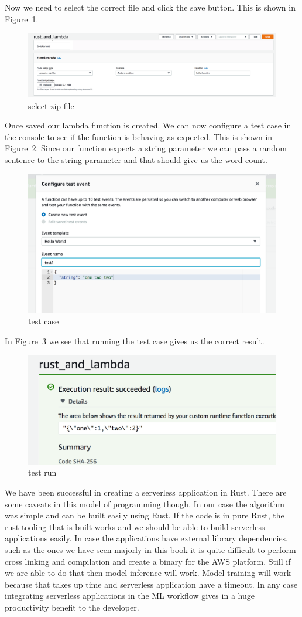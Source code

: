\documentclass{book}
\begin{document}
Now we need to select the correct file and click the save button. This is shown in Figure~\ref{fig:select_zip_file}.

\begin{figure}[htpb]
	\centering
	\includegraphics[width=0.8\linewidth]{select_file.png}
	\caption{select zip file}
	\label{fig:select_zip_file}
\end{figure}

Once saved our lambda function is created. We can now configure a test case in the console to see if the function is behaving as expected. This is shown in Figure~\ref{fig:test_case}. Since our function expects a string parameter we can pass a random sentence to the string parameter and that should give us the word count.

\begin{figure}[htpb]
	\centering
	\includegraphics[width=0.5\linewidth]{test_case.png}
	\caption{test case}
	\label{fig:test_case}
\end{figure}

In Figure~\ref{fig:test_run} we see that running the test case gives us the correct result.

\begin{figure}[htpb]
	\centering
	\includegraphics[width=0.5\linewidth]{run.png}
	\caption{test run}
	\label{fig:test_run}
\end{figure}

We have been successful in creating a serverless application in Rust. There are some caveats in this model of programming though. In our case the algorithm was simple and can be built easily using Rust. If the code is in pure Rust, the rust tooling that is built works and we should be able to build serverless applications easily. In case the applications have external library dependencies, such as the ones we have seen majorly in this book it is quite difficult to perform cross linking and compilation and create a binary for the AWS platform. Still if we are able to do that then model inference will work. Model training will work because that takes up time and serverless application have a timeout. In any case integrating serverless applications in the ML workflow gives in a huge productivity benefit to the developer.
\end{document}
